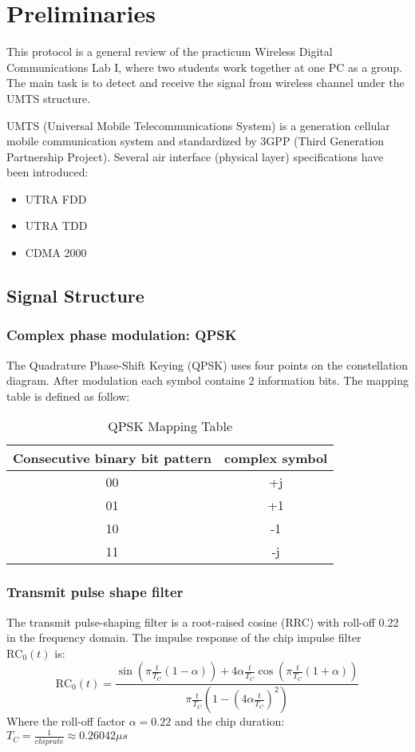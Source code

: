 \chapter*{Preliminaries}
This protocol is a general review of the practicum Wireless Digital Communications Lab I, where two students work together at one PC as a group. The main task is to detect and receive the signal from  wireless channel under the UMTS structure. 

UMTS (Universal Mobile Telecommunications System) is a  generation cellular mobile communication system and standardized by 3GPP (Third Generation Partnership Project). Several air interface (physical layer) specifications have been introduced:
\begin{itemize}
	\item UTRA FDD
	\item UTRA TDD
	\item CDMA 2000
\end{itemize}

\section{Signal Structure}
\subsection{Complex phase modulation: QPSK}
The Quadrature Phase-Shift Keying (QPSK) uses four points on the constellation diagram. After modulation each symbol contains 2 information bits. The mapping table is defined as follow:
\begin {table}[H]
\centering
\begin{tabular}{|c|c|}
	
	\hline
	Consecutive binary bit pattern & complex symbol \\    \hline
	00 & +j \\   \hline
	01 & +1 \\   \hline
	10 & -1 \\   \hline
	11 & -j \\   \hline

\end{tabular}
\caption {QPSK Mapping Table}
\end{table}

\subsection{Transmit pulse shape filter}
The transmit pulse-shaping filter is a root-raised cosine (RRC) with roll-off 0.22 in the frequency domain. The impulse response of the chip impulse filter $\text{RC}_0(t)$ is:
$$ \text{RC}_0(t) = \frac{\sin \left(\pi \frac{t}{T_C}(1-\alpha)\right) + 4\alpha \frac{t}{T_C} \cos \left( \pi \frac{t}{T_C}(1+\alpha) \right)}{\pi \frac{t}{T_C} \left( 1-\left( 4 \alpha \frac{t}{T_C} \right)^2 \right)} $$
Where the roll-off factor $\alpha = 0.22$ and the chip duration:
$T_C = \frac{1}{chiprate} \approx 0.26042 \mu s$

